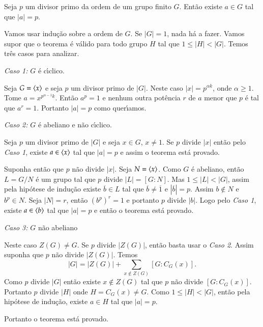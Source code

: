 \begin{teorema}
	Seja $p$ um divisor primo da ordem de um grupo finito $G$. Ent\~ao existe $a \in G$ tal que $|a| = p$.
\end{teorema}
\begin{prova}
	Vamos usar indu\c{c}\~ao sobre a ordem de $G$. Se $|G| = 1$, nada h\'a a fazer. Vamos supor que o teorema \'e v\'alido para todo grupo $H$ tal que $1 \le |H| < |G|$. Temos tr\^es casos para analizar.
	
	\noindent \textit{Caso 1:} $G$ \'e c{\'\i}clico.

	Seja $G = \langle{x}\rangle$  e seja $p$ um divisor primo de $|G|$. Neste caso $|x| = p^{\alpha k}$, onde $\alpha \ge 1$. Tome $a = x^{p^{\alpha - 1}k}$. Ent\~ao $a^p = 1$ e nenhum outra pot\^encia $r$ de $a$ menor que $p$ \'e tal que $a^r = 1$. Portanto $|a| = p$ como quer{\'\i}amos.

	\noindent \textit{Caso 2:} $G$ \'e abeliano e n\~ao c{\'\i}clico.

	Seja $p$ um divisor primo de $|G|$ e seja $x \in G$, $x \ne 1$. Se $p$ divide $|x|$ ent\~ao pelo \textit{Caso 1}, existe $a \in \langle{x}\rangle$ tal que $|a| = p$ e assim o teorema est\'a provado.

	Suponha ent\~ao que $p$ n\~ao divide $|x|$. Seja $N = \langle{x}\rangle$. Como $G$ \'e abeliano, ent\~ao $L = G/N$ \'e um grupo tal que $p$ divide $|L| = [G : N]$. Mas $1 \le |L| < |G|$, assim pela hip\'otese de indu\c{c}\~ao existe $\overline{b} \in L$ tal que $\overline{b} \ne \overline{1}$ e $|\overline{b}| = p$. Assim $b \notin N$ e $b^p \in N$. Seja $|N| = r$, ent\~ao $(b^p)^r = 1$ e portanto $p$ divide $|b|$. Logo pelo \textit{Caso 1}, existe $a \in \langle{b}\rangle$ tal que $|a| = p$ e ent\~ao o teorema est\'a provado.

	\noindent \textit{Caso 3:} $G$ n\~ao abeliano

	Neste caso $Z(G) \ne G$. Se $p$ divide $|Z(G)|$, ent\~ao basta usar o \textit{Caso 2}. Assim suponha que $p$ n\~ao divide $|Z(G)|$. Temos
	\[
		|G| = |Z(G)| + \sum_{x \notin Z(G)}[G : C_G(x)].
	\]
	Como $p$ divide $|G|$ ent\~ao existe $x \notin Z(G)$ tal que $p$ n\~ao divide $[G : C_G(x)]$. Portanto $p$ divide $|H|$ onde $H = C_G(x) \ne G$. Como $1 \le |H| < |G|$, ent\~ao pela hip\'otese de indu\c{c}\~ao, existe $a \in H$ tal que $|a| = p$.

	Portanto o teorema est\'a provado.
\end{prova}



